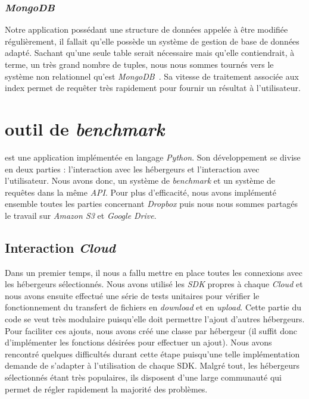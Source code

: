 \documentclass[10pt]{article}
\begin{document}
\subsubsection{\textit{MongoDB}}

Notre application possédant une structure de données appelée à être modifiée
régulièrement, il fallait qu'elle possède un système de gestion de base de
données adapté. Sachant qu'une seule table serait nécessaire mais qu'elle
contiendrait, à terme, un très grand nombre de tuples, nous nous sommes tournés
vers le système non relationnel qu'est \textit{MongoDB}~\cite{MongoDB}. Sa vitesse de
traitement associée aux index permet de requêter très rapidement pour fournir
un résultat à l'utilisateur.

\section{\KYD outil de \textit{benchmark} }

\KYD est une application implémentée en langage \textit{Python}. Son
développement se divise en deux parties : l'interaction avec les hébergeurs et
l'interaction avec l'utilisateur. Nous avons donc, un système de
\textit{benchmark} et un système de requêtes dans la même \textit{API}. Pour plus
d'efficacité, nous avons implémenté ensemble toutes les parties concernant
\textit{Dropbox} puis nous nous sommes partagés le travail sur \textit{Amazon
S3} et \textit{Google Drive}.

\subsection{Interaction \textit{Cloud}}

Dans un premier temps, il nous a fallu mettre en place toutes les
connexions avec les hébergeurs sélectionnés. Nous avons utilisé les
\textit{SDK} propres à chaque \textit{Cloud} et nous avons ensuite
effectué une série de tests unitaires pour vérifier le fonctionnement
du transfert de fichiers en \textit{download} et en
\textit{upload}. Cette partie du code se veut très modulaire
puisqu'elle doit permettre l'ajout d'autres hébergeurs. Pour faciliter
ces ajouts, nous avons créé une classe par hébergeur (il suffit donc
d'implémenter les fonctions désirées pour effectuer un ajout). Nous
avons rencontré quelques difficultés durant cette étape puisqu'une
telle implémentation demande de s'adapter à l'utilisation de chaque
SDK. Malgré tout, les hébergeurs sélectionnés étant très populaires,
ils disposent d'une large communauté qui permet de régler rapidement
la majorité des problèmes.
\end{document}
